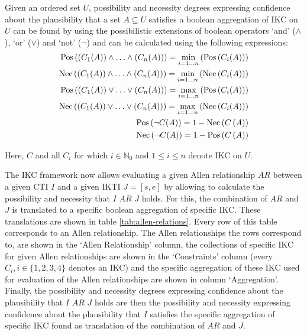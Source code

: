 Given an ordered set $U$, possibility and necessity degrees expressing confidence about the plausibility that a set $A \subseteq U$ satisfies a boolean aggregation of IKC on $U$ can be found by using the possibilistic extensions of boolean operators `and' ($\wedge$), `or' ($\vee$) and `not' ($\neg$) and can be calculated using the following expressions:
\vspace{-5pt}
\begin{align}
\operatorname{Pos}\left(\left(C_1(A)\right) \wedge \ldots \wedge \left(C_n(A)\right)\right) = \min_{i=1 \ldots n} \left(\operatorname{Pos}\left(C_i(A)\right)\right) \nonumber \\
\operatorname{Nec}\left(\left(C_1(A)\right) \wedge \ldots \wedge \left(C_n(A)\right)\right) = \min_{i=1 \ldots n} \left(\operatorname{Nec}\left(C_i(A)\right)\right) \nonumber \\
\operatorname{Pos}\left(\left(C_1(A)\right) \vee \ldots \vee \left(C_n(A)\right)\right) = \max_{i=1 \ldots n} \left(\operatorname{Pos}\left(C_i(A)\right)\right) \nonumber \\
\operatorname{Nec}\left(\left(C_1(A)\right) \vee \ldots \vee \left(C_n(A)\right)\right) = \max_{i=1 \ldots n} \left(\operatorname{Nec}\left(C_i(A)\right)\right) \nonumber \\
\operatorname{Pos}\left(\neg C(A)\right) = 1 - \operatorname{Nec}\left(C\left(A\right)\right) \nonumber \\
\operatorname{Nec}\left(\neg C(A)\right) = 1 - \operatorname{Pos}\left(C\left(A\right)\right) \nonumber
\end{align}

Here, $C$ and all $C_i$ for which $i \in \mathbb{N}_0$ and $1 \leq i \leq n$ denote IKC on $U$.

The IKC framework now allows evaluating a given Allen relationship $AR$ between a given CTI $I$ and a given IKTI $J = \left[s, e\right]$ by allowing to calculate the possibility and necessity that $I$ $AR$ $J$ holds. For this, the combination of $AR$ and $J$ is translated to a specific boolean aggregation of specific IKC. These translations are shown in table \ref{tab:allen-relations}. Every row of this table corresponds to an Allen relationship. The Allen relationships the rows correspond to, are shown in the `Allen Relationship' column, the collections of specific IKC for given Allen relationships are shown in the `Constraints' column (every $C_i, i \in \{1, 2, 3, 4\}$ denotes an IKC) and the specific aggregation of these IKC used for evaluation of the Allen relationships are shown in column `Aggregation'. Finally, the possibility and necessity degrees expressing confidence about the plausibility that $I$ $AR$ $J$ holds are then the possibility and necessity expressing confidence about the plausibility that $I$ satisfies the specific aggregation of specific IKC found as translation of the combination of $AR$ and $J$.


